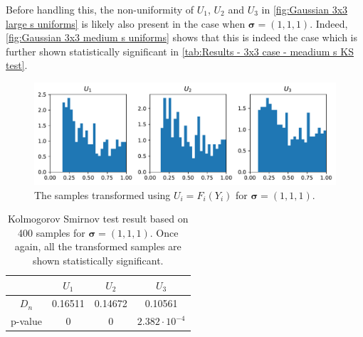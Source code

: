 \documentclass[../Thesis.tex]{subfiles}
\begin{document}




Before handling this, the non-uniformity of $U_1$, $U_2$ and $U_3$ in \autoref{fig:Gaussian 3x3 large s uniforms} is likely also present in the case when $\boldsymbol\sigma = (1,1,1)$. Indeed, \autoref{fig:Gaussian 3x3 medium s uniforms} shows that this is indeed the case which is further shown statistically significant in \autoref{tab:Results - 3x3 case - meadium s KS test}.
\begin{figure}[H]
    \centering
    \includegraphics[width=0.99\linewidth]{figures/ND examples/Gaussian 3x3 medium s uniforms.pdf}
    \caption{The samples transformed using $U_i = F_i(Y_i)$ for $\boldsymbol\sigma = (1,1,1)$.}
    \label{fig:Gaussian 3x3 medium s uniforms}
\end{figure}
\begin{table}[ht]
    \centering
    \begin{tabular}{c|c|c|c}
                & $U_1$   & $U_2$   & $U_3$                 \\\hline
        $D_n$   & 0.16511 & 0.14672 & 0.10561               \\
        p-value & 0       & 0       & $2.382 \cdot 10^{-4}$
    \end{tabular}
    \caption{Kolmogorov Smirnov test result based on 400 samples for $\boldsymbol\sigma = (1, 1, 1)$. Once again, all the transformed samples are shown statistically significant.}
    \label{tab:Results - 3x3 case - meadium s KS test}
\end{table}


\end{document}

